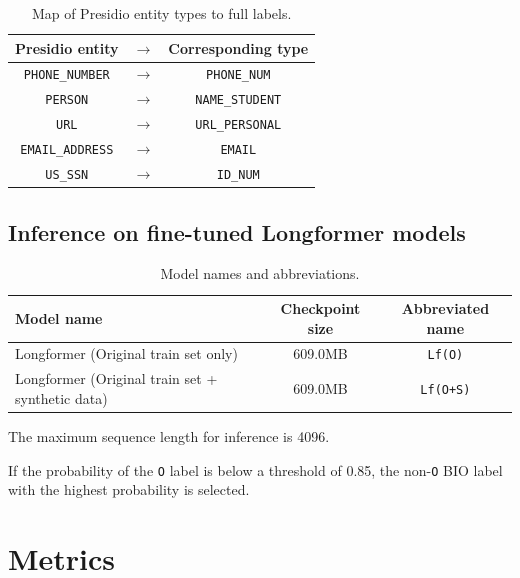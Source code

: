 \documentclass[11pt]{article}
\newcounter{savedfootnote}
\newcommand{\daggerfootnotes}{
    \setcounter{savedfootnote}{\value{footnote}} %
    \renewcommand{\thefootnote}{\fnsymbol{footnote}}
    \setcounter{footnote}{1} %
}
\newcommand{\numericfootnotes}{
    \setcounter{footnote}{\value{savedfootnote}} %
    \renewcommand{\thefootnote}{\arabic{footnote}}
}
\begin{document}
\begin{table}[h!]
  \centering
  \caption{Map of Presidio entity types to full labels.}
  \label{tab:entity_label_mapping}
  \begin{tabular}{ccc}
    \toprule
    \textbf{Presidio entity} & \(\rightarrow\) & \textbf{Corresponding type} \\
    \midrule
    \texttt{PHONE\_NUMBER} & \(\rightarrow\) & \texttt{PHONE\_NUM} \\
    \texttt{PERSON} & \(\rightarrow\) & \texttt{NAME\_STUDENT} \\
    \texttt{URL} & \(\rightarrow\) & \texttt{URL\_PERSONAL} \\
    \texttt{EMAIL\_ADDRESS} & \(\rightarrow\) & \texttt{EMAIL} \\
    \texttt{US\_SSN} & \(\rightarrow\) & \texttt{ID\_NUM} \\
    \bottomrule
  \end{tabular}
\end{table}

\subsection{Inference on fine-tuned Longformer models}

\begin{table}[t]
  \centering
  \caption{Model names and abbreviations.}
  \label{tab:model_specs}
  \begin{tabularx}{\textwidth}{Xcc}
    \toprule
    \textbf{Model name} & \textbf{Checkpoint size} & \textbf{Abbreviated name} \\
    \midrule
    Longformer (Original train set only) & 609.0MB & \texttt{Lf(O)} \\
    Longformer (Original train set + synthetic data) & 609.0MB & \texttt{Lf(O+S)} \\
    \bottomrule
  \end{tabularx}
\end{table}

The maximum sequence length for inference is 4096.

If the probability of the \texttt{O} label is below a threshold of 0.85, the non-\texttt{O} BIO label with the highest probability is selected.

\daggerfootnotes
\section{Metrics}
\numericfootnotes
\end{document}
